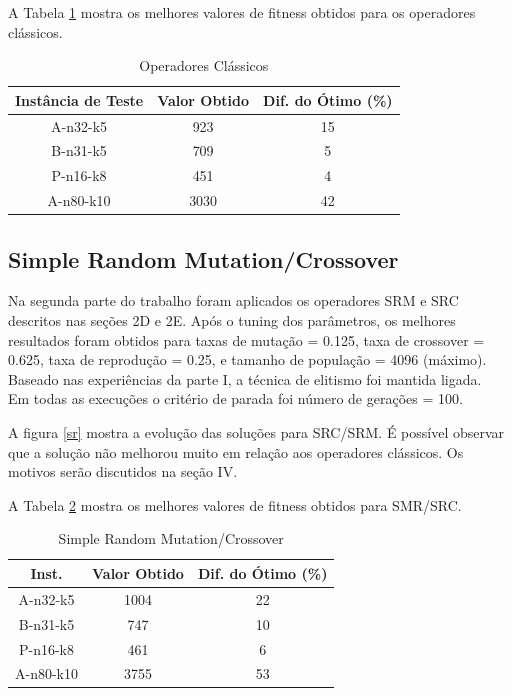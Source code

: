 \documentclass[conference]{IEEEtran}
\begin{document}
A Tabela \ref{table_classical_operators} mostra os melhores valores de fitness obtidos para os operadores clássicos.

\begin{table}[!t]
\renewcommand{\arraystretch}{1.3}
\centering
\caption{Operadores Clássicos}
\label{table_classical_operators}
\begin{tabular}{|c||c||c|}
\hline
Instância de Teste & Valor Obtido & Dif. do Ótimo (\%)\\
\hline
A-n32-k5 & 923 & 15\\   %
B-n31-k5 & 709 & 5\\    %
P-n16-k8 & 451 & 4\\    %
A-n80-k10 & 3030 & 42\\ %
\hline
\end{tabular}
\end{table}


\subsection{Simple Random Mutation/Crossover}
Na segunda parte do trabalho foram aplicados os operadores SRM e SRC descritos nas seções 2D e 2E. Após o tuning dos parâmetros, os melhores resultados foram obtidos para taxas de mutação = 0.125, taxa de crossover = 0.625, taxa de reprodução = 0.25, e tamanho de população = 4096 (máximo). Baseado nas experiências da parte I, a técnica de elitismo foi mantida ligada.\\
Em todas as execuções o critério de parada foi número de gerações = 100.

A figura \ref{sr} mostra  a evolução das soluções para SRC/SRM. É possível observar que a solução não melhorou muito em relação aos operadores clássicos. Os motivos serão discutidos na seção IV.

A Tabela \ref{table_srm} mostra os melhores valores de fitness obtidos para SMR/SRC.

\begin{table}[!t]
\renewcommand{\arraystretch}{1.3}
\centering
\caption{Simple Random Mutation/Crossover}
\label{table_srm}
\begin{tabular}{|c||c||c|}
\hline
Inst. & Valor Obtido & Dif. do Ótimo (\%)\\
\hline
A-n32-k5 & 1004 & 22\\  %
B-n31-k5 & 747 & 10\\   %
P-n16-k8 & 461 & 6\\    %
A-n80-k10 & 3755 & 53\\ %
\hline
\end{tabular}
\end{table}
\end{document}
